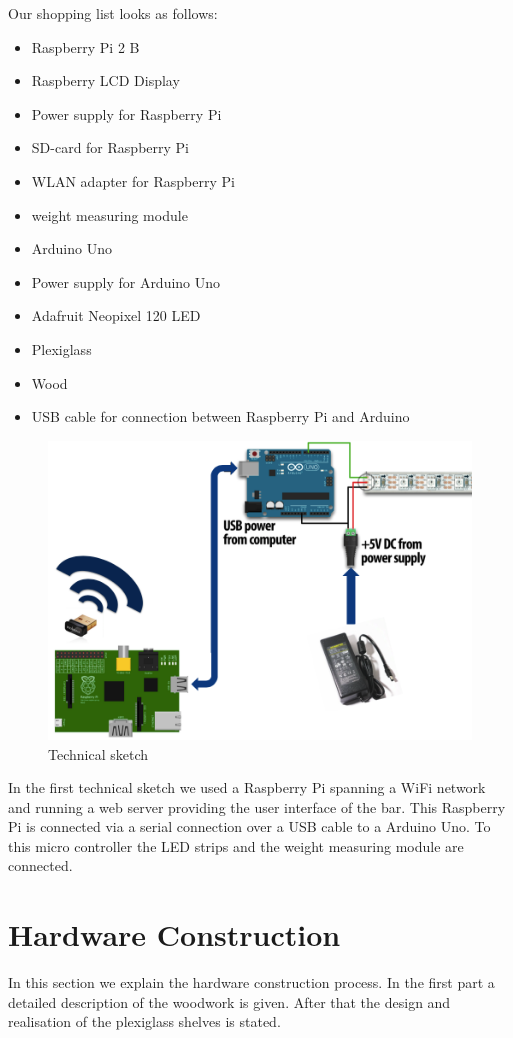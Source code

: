 \documentclass{acm_proc_article-sp}
\begin{document}
Our shopping list looks as follows:
\begin{itemize}
\item Raspberry Pi 2 B
\item Raspberry LCD Display
\item Power supply for Raspberry Pi
\item SD-card for Raspberry Pi
\item WLAN adapter for Raspberry Pi
\item weight measuring module
\item Arduino Uno
\item Power supply for Arduino Uno
\item Adafruit Neopixel 120 LED
\item Plexiglass
\item Wood
\item USB cable for connection between Raspberry Pi and Arduino
\end{itemize}
\begin{figure}[htbp] 
  \centering
     \includegraphics[width=0.7\linewidth]{pictures/technical.png}
  \caption{Technical sketch}
  \label{fig:technical}
\end{figure}

In the first technical sketch we used a Raspberry Pi spanning a WiFi network and running a web server providing the user interface of the bar. This Raspberry Pi is connected via a serial connection over a USB cable to a Arduino Uno. To this micro controller the LED strips and the weight measuring module are connected.

\section{Hardware Construction}
In this section we explain the hardware construction process. In the first part a detailed description of the woodwork is given. After that the design and realisation of the plexiglass shelves is stated.
\end{document}
